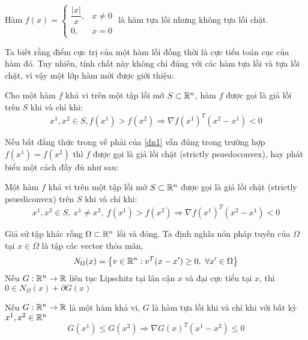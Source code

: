 \begin{vd}
Hàm 
$
f(x) = 
\begin{cases}
\dfrac{|x|}{x}, &x \neq 0 \\
0, & x = 0
\end{cases}
$
là hàm tựa lồi nhưng không tựa lồi chặt.
\end{vd}
Ta biết rằng điểm cực trị của một hàm lồi đồng thời là cực tiểu toán cục của hàm đó. Tuy nhiên, tính chất này không chỉ đúng với các hàm tựa lồi và tựa lồi chặt, vì vậy một lớp hàm mới được giới thiệu:
\begin{dn}
    \label{psuedoconvex_def}
    Cho một hàm $f$ khả vi trên một tập lồi mở $S \subset \mathbb{R}^n$, hàm $f$ được gọi là giả lồi trên $S$ khi và chỉ khi:
    \begin{equation}
    \label{dn1}
    x^1, x^2 \in S, f(x^1) > f(x^2) \Rightarrow \nabla f(x^1)^T (x^2 - x^1) < 0
    \end{equation}
\end{dn}
Nếu bất đẳng thức trong vế phải của \eqref{dn1} vẫn đúng trong trường hợp $f(x^1) = f(x^2)$ thì $f$ được gọi là giả lồi chặt (strictly psuedoconvex), hay phát biểu một cách đầy đủ như sau:
\begin{dn}
    Một hàm $f$ khả vi trên một tập lồi mở $S \subset \mathbb{R}^n$ được gọi là giả lồi chặt (strictly psuediconvex) trên $S$ khi và chỉ khi:
    \begin{equation*}
        x^1, x^2 \in S,\ x^1 \neq x^2,\ f(x^1) > f(x^2) \Rightarrow \nabla f(x^1)^T (x^2 - x^1) < 0
    \end{equation*}
\end{dn}

\begin{md}
    \label{normal_cone_prop}
    Giả sử tập khác rỗng $\Omega \subset \mathbb{R}^n$ lồi và đóng. Ta định nghĩa nón pháp tuyến của $\Omega$ tại $x \in \Omega$ là tập các vector thỏa mãn,
    \begin{equation*}
        N_\Omega(x) = \left\{ v \in \mathbb{R}^n: v^T(x - x^\prime) \geq 0,\ \forall x^\prime \in \Omega \right\}
    \end{equation*}
    Nếu $G: \mathbb{R}^n \to \mathbb{R}$ liên tục Lipschitz tại lân cận $x$ và đại cực tiểu tại $x$, thì $0 \in N_\Omega(x) + \partial G(x)$
\end{md}

\begin{md}
    \label{md_quasi}
    Nếu $G: \mathbb{R}^n \to \mathbb{R}$ là một hàm khả vi, $G$ là hàm tựa lồi khi và chỉ khi với bất kỳ $x^1, x^2 \in \mathbb{R}^n$
    \begin{equation*}
        G(x^1) \leq G(x^2) \Rightarrow \nabla G(x)^T (x^1 - x^2) \leq 0
    \end{equation*}
\end{md}
